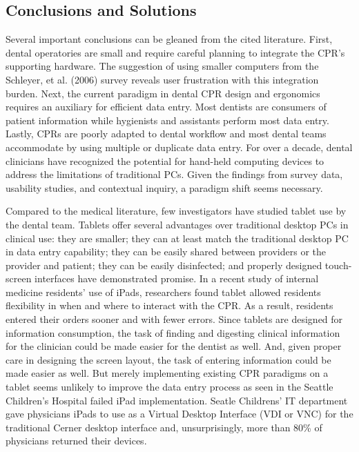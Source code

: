 \documentclass[11pt]{article}
\begin{document}
\subsection{Conclusions and Solutions}
Several important conclusions can be gleaned from the cited literature. First, dental operatories are small and require careful planning to integrate the CPR's supporting hardware. The suggestion of using smaller computers from the Schleyer, et al. (2006) survey reveals user frustration with this integration burden. Next, the current paradigm in dental CPR design and ergonomics requires an auxiliary for efficient data entry. Most dentists are consumers of patient information while hygienists and assistants perform most data entry. Lastly, CPRs are poorly adapted to dental workflow and most dental teams accommodate by using multiple or duplicate data entry. For over a decade, dental clinicians have recognized the potential for hand-held computing devices to address the limitations of traditional PCs.\cite{Taylor2002Handheld-comput,Jablow2003Your-practice-i} Given the findings from survey data, usability studies, and contextual inquiry, a paradigm shift seems necessary.

Compared to the medical literature, few investigators have studied tablet use by the dental team.\cite{Frank2010IPad--tool-or-t} Tablets offer several advantages over traditional desktop PCs in clinical use: they are smaller; they can at least match the traditional desktop PC in data entry capability\cite{Kirby1996The-PEN--PAD-da,Mackenzi2002Text-entry-for-}; they can be easily shared between providers or the provider and patient; they can be easily disinfected\cite{Mayrhofer2007Pen-based-Elect}; and properly designed touch-screen interfaces have demonstrated promise.\cite{Haller2009Handheld-vs.-la,Mulligen1998Clinical-data-e,Baumgart2005Personal-digita,Lu2005A-review-and-a-} In a recent study of internal medicine residents' use of iPads\cite{Patel2012Impact-of-Mobil}, researchers found tablet allowed residents flexibility in when and where to interact with the CPR. As a result, residents entered their orders sooner and with fewer errors. Since tablets are designed for information consumption, the task of finding and digesting clinical information for the clinician could be made easier for the dentist as well. And, given proper care in designing the screen layout, the task of entering information could be made easier as well. But merely implementing existing CPR paradigms on a tablet seems unlikely to improve the data entry process as seen in the Seattle Children's Hospital failed iPad implementation.\cite{Kaneshige2011iPad-in-Healthc} Seatle Childrens' IT department gave physicians iPads to use as a Virtual Desktop Interface (VDI or VNC) for the traditional Cerner desktop interface and, unsurprisingly, more than 80\% of physicians returned their devices.
\end{document}
